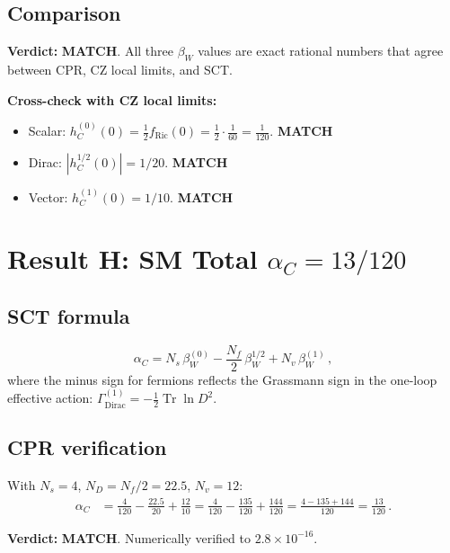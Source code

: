 \documentclass[12pt,a4paper]{article}
\theoremstyle{definition}
\theoremstyle{remark}
\newcommand{\Tr}{\operatorname{Tr}}
\newcommand{\match}{\textcolor{green!60!black}{\textbf{MATCH}}}
\begin{document}
\subsection{Comparison}

\textbf{Verdict:} \match.  All three $\beta_W$ values are exact rational numbers
that agree between CPR, CZ local limits, and SCT.

\medskip\noindent
\textbf{Cross-check with CZ local limits:}
\begin{itemize}[nosep]
\item Scalar: $h_C^{(0)}(0) = \frac{1}{2}f_{\text{Ric}}(0) = \frac{1}{2}\cdot\frac{1}{60} = \frac{1}{120}$. \match
\item Dirac: $|h_C^{1/2}(0)| = 1/20$. \match
\item Vector: $h_C^{(1)}(0) = 1/10$. \match
\end{itemize}


\section{Result H: SM Total $\alpha_C = 13/120$}
\label{sec:alpha}

\subsection{SCT formula}

\begin{equation}
  \alpha_C = N_s\,\beta_W^{(0)} - \frac{N_f}{2}\,\beta_W^{1/2}
             + N_v\,\beta_W^{(1)}\,,
\end{equation}
where the minus sign for fermions reflects the Grassmann sign in the
one-loop effective action: $\Gamma^{(1)}_{\text{Dirac}} = -\frac{1}{2}\Tr\ln D^2$.

\subsection{CPR verification}

With $N_s = 4$, $N_D = N_f/2 = 22.5$, $N_v = 12$:
\begin{align}
  \alpha_C &= \frac{4}{120} - \frac{22.5}{20} + \frac{12}{10}
  = \frac{4}{120} - \frac{135}{120} + \frac{144}{120}
  = \frac{4 - 135 + 144}{120}
  = \frac{13}{120}\,.
\end{align}

\textbf{Verdict:} \match.  Numerically verified to $2.8 \times 10^{-16}$.
\end{document}
